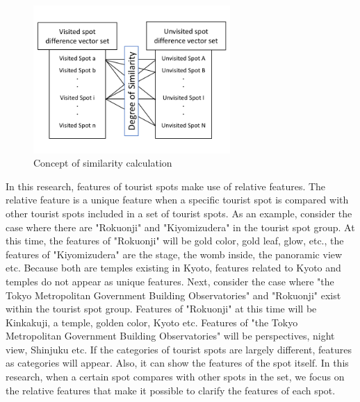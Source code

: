\documentclass[journal]{IAENGtran}
\begin{document}
\begin{figure}[t]
  \begin{center}
    \includegraphics[clip,width=7.5cm,bb=0 0 720 540]{picture/Photo_CosSim_eng.png}
    \caption{Concept of similarity calculation}
    \label{fig:Photo_CosSim}
    \end{center}
\end{figure}

In this research, features of tourist spots make use of relative features.
The relative feature is a unique feature when a specific tourist spot is compared with other tourist spots included in a set of tourist spots.
As an example, consider the case where there are "Rokuonji" and "Kiyomizudera" in the tourist spot group.
At this time, the features of "Rokuonji" will be gold color, gold leaf, glow, etc., the features of "Kiyomizudera" are the stage, the womb inside, the panoramic view etc.
Because both are temples existing in Kyoto, features related to Kyoto and temples do not appear as unique features.
Next, consider the case where "the Tokyo Metropolitan Government Building Observatories" and "Rokuonji" exist within the tourist spot group.
Features of "Rokuonji" at this time will be Kinkakuji, a temple, golden color, Kyoto etc.
Features of "the Tokyo Metropolitan Government Building Observatories" will be perspectives, night view, Shinjuku etc.
If the categories of tourist spots are largely different, features as categories will appear.
Also, it can show the features of the spot itself.
In this research, when a certain spot compares with other spots in the set, we focus on the relative features that make it possible to clarify the features of each spot.
\end{document}
